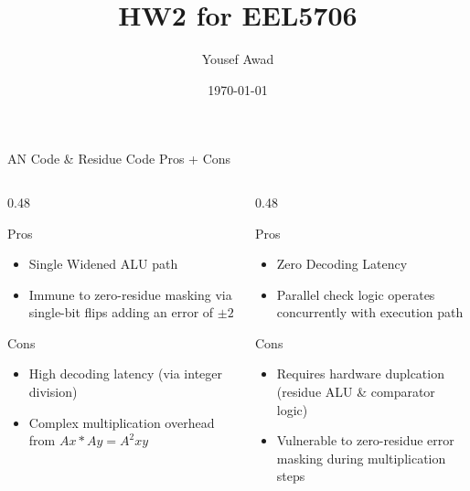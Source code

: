 \documentclass[aspectratio=169]{beamer}
\title[EEL 5706 - HW2]{HW2 for EEL5706}
\author{Yousef Awad}
\date{\today}
\begin{document}
\begin{frame}{AN Code \& Residue Code Pros + Cons}

  \begin{columns}[T, onlytextwidth]

    \begin{column}{0.48\textwidth}
      \vspace{0.2cm}

      \begin{exampleblock}{Pros}
        \begin{itemize}\footnotesize
          \item Single Widened ALU path
          \item Immune to zero-residue masking via single-bit flips adding an error of $\pm 2$
        \end{itemize}
      \end{exampleblock}

      \begin{alertblock}{Cons}
        \begin{itemize}\footnotesize
          \item High decoding latency (via integer division)
          \item Complex multiplication overhead from $Ax * Ay = A^2xy$
        \end{itemize}
      \end{alertblock}
    \end{column}

    \hfill

    \begin{column}{0.48\textwidth}
      \vspace{0.2cm}

      \begin{exampleblock}{Pros}
        \begin{itemize}\footnotesize
          \item Zero Decoding Latency
          \item Parallel check logic operates concurrently with execution path
        \end{itemize}
      \end{exampleblock}

      \begin{alertblock}{Cons}
        \begin{itemize}\footnotesize
          \item Requires hardware duplcation (residue ALU \& comparator logic)
          \item Vulnerable to zero-residue error masking during multiplication steps
        \end{itemize}
      \end{alertblock}
    \end{column}

  \end{columns}
\end{frame}
\end{document}

